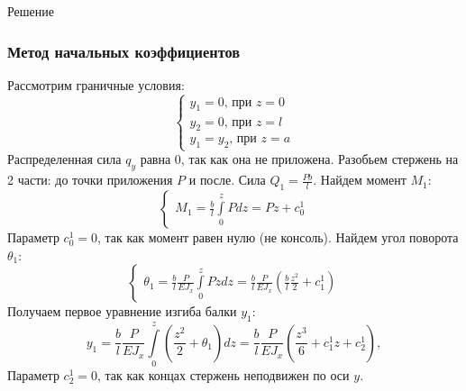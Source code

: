 \documentclass[12pt, a4paper]{article}
\begin{document}
\begin{center}Решение\end{center}

\subsubsection{Метод начальных коэффициентов}

Рассмотрим граничные условия:
\begin{equation}
	\label{diffbsec}
	\begin{cases}
		y_1 = 0 \mbox{, при } z = 0\\
		y_2 = 0 \mbox{, при } z = l\\
		y_1 = y_2 \mbox{, при } z = a
	\end{cases}
\end{equation}
Распределенная сила $q_{y}$ равна  0, так как она не приложена. Разобьем стержень на 2 части: до точки приложения $P$ и после. Сила $Q_1 = \frac{P b}{l} $. 
Найдем момент $M_1$:
\begin{equation}
	\label{z221}
	\begin{cases}
		M_1 = \frac{b}{l} \int\limits_0^z P d z = P z + c_0^1 
	\end{cases}
\end{equation}
Параметр $c_0^1 = 0$, так как момент равен нулю (не консоль).
Найдем угол поворота $\theta_1$:
\begin{equation}
	\label{z222}
	\begin{cases}
	\theta_1 = \frac{b}{l} \frac{P}{E J_{x}} \int\limits_0^z P z d z = \frac{b}{l} \frac{P}{E J_{x}} (\frac{b}{l} \frac{z^2}{2} + c_1^1)
	\end{cases}
\end{equation}
Получаем первое уравнение изгиба балки $y_1$: 
\begin{equation}
	\label{z112}
	y_1 = \frac{b}{l} \frac{P}{E J_{x}} \int\limits_0^z (\frac{z^2}{2} + \theta_1) dz =  \frac{b}{l} \frac{P}{E J_{x}} (\frac{z^3}{6} + c_1^1 z + c_2^1),
\end{equation}
Параметр $c_2^1 = 0$, так как концах стержень неподвижен по оси $y$. 
\end{document}
